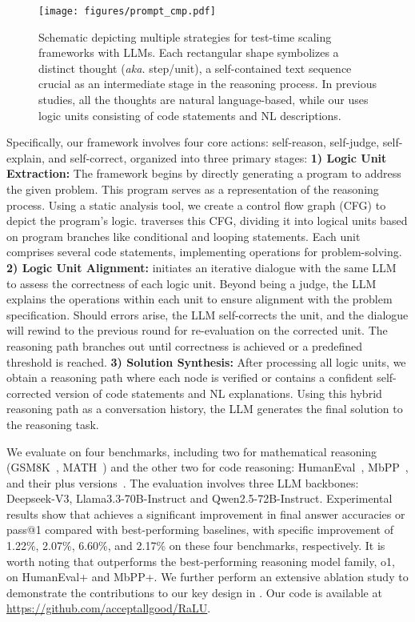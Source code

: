 \begin{figure*}[htbp]
    \centering
    \vspace{-0.1in}
        {\texttt{[image: figures/prompt\_cmp.pdf]}}
    \vspace{-0.1in}
    \caption{Schematic depicting multiple strategies for test-time scaling frameworks with LLMs. Each rectangular shape symbolizes a distinct thought (\textit{aka.} step/unit), a self-contained text sequence crucial as an intermediate stage in the reasoning process. In previous studies, all the thoughts are natural language-based, while our \tool uses logic units consisting of code statements and NL descriptions.}
    \vspace{-0.2in}
    \label{fig:path-cmp}
\end{figure*}


Specifically, our framework involves four core actions: self-reason, self-judge, self-explain, and self-correct, organized into three primary stages:
\textbf{1) Logic Unit Extraction:} 
The framework begins by directly generating a program to address the given problem. This program serves as a representation of the reasoning process. Using a static analysis tool, we create a control flow graph (CFG) to depict the program's logic.
\tool traverses this CFG, dividing it into logical units based on program branches like conditional and looping statements. 
Each unit comprises several code statements, implementing operations for problem-solving. 
%
\textbf{2) Logic Unit Alignment:}
\tool initiates an iterative dialogue with the same LLM to assess the correctness of each logic unit.
Beyond being a judge, the LLM explains the operations within each unit to ensure alignment with the problem specification. 
Should errors arise, the LLM self-corrects the unit, and the dialogue will rewind to the previous round for re-evaluation on the corrected unit.
The reasoning path branches out until correctness is achieved or a predefined threshold is reached.
%
\textbf{3) Solution Synthesis:}
After processing all logic units, we obtain a reasoning path where each node is verified or contains a confident self-corrected version of code statements and NL explanations. 
Using this hybrid reasoning path as a conversation history, the LLM generates the final solution to the reasoning task.

We evaluate \tool on four benchmarks, including two for mathematical reasoning (GSM8K~\cite{GSM8K}, MATH~\cite{MATH}) and the other two for code reasoning: HumanEval~\cite{HumanEval}, MbPP~\cite{Mbpp}, and their plus versions~\cite{Evalo1}.
The evaluation involves three LLM backbones: Deepseek-V3, Llama3.3-70B-Instruct and Qwen2.5-72B-Instruct.
Experimental results show that \tool achieves a significant improvement in final answer accuracies or pass@1 compared with best-performing baselines, with specific improvement of 1.22\%, 2.07\%, 6.60\%, and 2.17\% on these four benchmarks, respectively.
It is worth noting that \tool outperforms the best-performing reasoning model family, o1, on HumanEval+ and MbPP+.
We further perform an extensive ablation study to demonstrate the contributions to our key design in \tool.
Our code is available at \url{https://github.com/acceptallgood/RaLU}.

